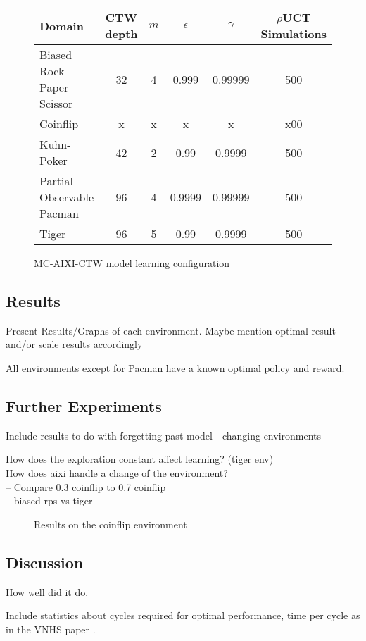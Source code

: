 \documentclass[paper=a4, fontsize=11pt]{scrartcl} %
\numberwithin{equation}{section} %
\numberwithin{figure}{section} %
\numberwithin{table}{section} %
\begin{document}
\begin{figure}[H]
\centering
\begin{tabular}{|l|c|c|c|c|c|}
\hline
Domain & CTW depth & $m$ & $\epsilon$ & $\gamma$ & $\rho$UCT Simulations\\\hline
Biased Rock-Paper-Scissor & 32 & 4 & 0.999 & 0.99999 & 500\\
Coinflip & x & x & x & x & x00\\
Kuhn-Poker & 42 & 2 & 0.99 & 0.9999 & 500\\
Partial Observable Pacman & 96 & 4 & 0.9999 & 0.99999 & 500\\
Tiger & 96 & 5 & 0.99 & 0.9999 & 500\\\hline
\end{tabular}
\caption{\label{tab:setup}MC-AIXI-CTW model learning configuration}
\end{figure}


\subsection{Results}
Present Results/Graphs of each environment. Maybe mention optimal result and/or scale results accordingly

All environments except for Pacman have a known optimal policy and reward.

\subsection{Further Experiments}
Include results to do with forgetting past model - changing environments

How does the exploration constant affect learning? (tiger env)\\
How does aixi handle a change of the environment?\\
-- Compare 0.3 coinflip to 0.7 coinflip\\
-- biased rps vs tiger\\

\begin{figure}

\caption{\label{plot:coinflip}Results on the coinflip environment}
\end{figure}


\subsection{Discussion}
How well did it do.

Include statistics about cycles required for optimal performance, time per cycle as in the VNHS paper \cite{VNHS09}.




\end{document}
